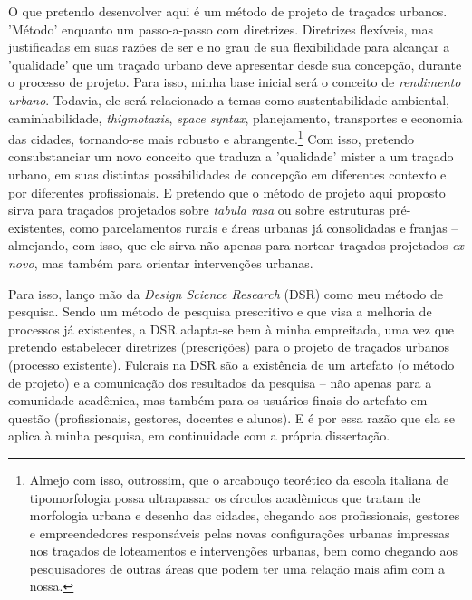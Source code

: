 \documentclass[]{report}
\begin{document}
    O que pretendo desenvolver aqui é um método de projeto de traçados urbanos. 'Método' enquanto um passo-a-passo com diretrizes. Diretrizes flexíveis, mas justificadas em suas razões de ser e no grau de sua flexibilidade para alcançar a 'qualidade' que um traçado urbano deve apresentar desde sua concepção, durante o processo de projeto. Para isso, minha base inicial será o conceito de \textit{rendimento urbano}. Todavia, ele será relacionado a temas como sustentabilidade ambiental, caminhabilidade, \textit{thigmotaxis}, \textit{space syntax}, planejamento, transportes e economia das cidades, tornando-se mais robusto e abrangente.\footnote[1]{Almejo com isso, outrossim, que o arcabouço teorético da escola italiana de tipomorfologia possa ultrapassar os círculos acadêmicos que tratam de morfologia urbana e desenho das cidades, chegando aos profissionais, gestores e empreendedores responsáveis pelas novas configurações urbanas impressas nos traçados de loteamentos e intervenções urbanas, bem como chegando aos pesquisadores de outras áreas que podem ter uma relação mais afim com a nossa.} Com isso, pretendo consubstanciar um novo conceito que traduza a 'qualidade' mister a um traçado urbano, em suas distintas possibilidades de concepção em diferentes contexto e por diferentes profissionais. E pretendo que o método de projeto aqui proposto sirva para traçados projetados sobre \textit{tabula rasa} ou sobre estruturas pré-existentes, como parcelamentos rurais e áreas urbanas já consolidadas e franjas – almejando, com isso, que ele sirva não apenas para nortear traçados projetados \textit{ex novo}, mas também para orientar intervenções urbanas. 

    Para isso, lanço mão da \textit{Design Science Research} (DSR) como meu método de pesquisa. Sendo um método de pesquisa prescritivo e que visa a melhoria de processos já existentes, a DSR adapta-se bem à minha empreitada, uma vez que pretendo estabelecer diretrizes (prescrições) para o projeto de traçados urbanos (processo existente). Fulcrais na DSR são a existência de um artefato (o método de projeto) e a comunicação dos resultados da pesquisa – não apenas para a comunidade acadêmica, mas também para os usuários finais do artefato em questão (profissionais, gestores, docentes e alunos). E é por essa razão que ela se aplica à minha pesquisa, em continuidade com a própria dissertação.
\end{document}
